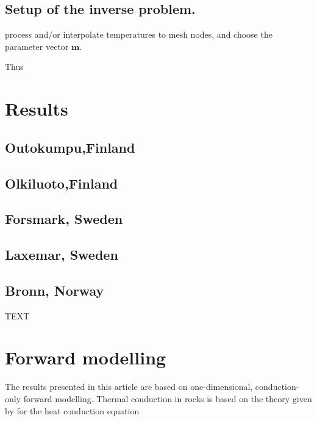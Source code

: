 \documentclass[cp]{copernicus}
\begin{document}
\subsection{Setup of the inverse problem.} process and/or interpolate temperatures to mesh nodes, 
and choose the parameter vector $\mathbf{m}$.

 Thus 

\section{Results}
\subsection{Outokumpu,Finland}
\subsection{Olkiluoto,Finland}
\subsection{Forsmark, Sweden}
\subsection{Laxemar, Sweden}
\subsection{Bronn, Norway}

\conclusions  %
TEXT






\appendix

\section{Forward modelling}
\label{app:fwd}
The results presented in this article are based on one-dimensional, conduction-only forward 
modelling. Thermal conduction in rocks is based on the theory given by \citet{Carslaw1959a} for 
the heat conduction equation 
\end{document}
